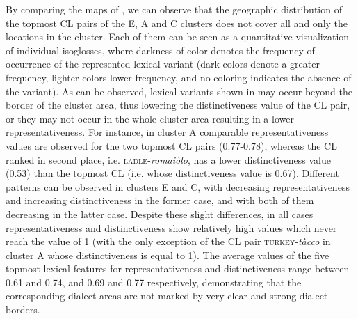 \documentclass[output=paper]{LSP/langsci}
\begin{document}
By comparing the maps of , we can observe that the geographic distribution of the topmost CL pairs of the E, A and C clusters does not cover all and only the locations in the cluster. Each of them can be seen as a quantitative visualization of individual isoglosses, where darkness of color denotes the frequency of occurrence of the represented lexical variant (dark colors denote a greater frequency, lighter colors lower frequency, and no coloring indicates the absence of the variant). As can be observed, lexical variants shown in  may occur beyond the border of the cluster area, thus lowering the distinctiveness value of the CL pair, or they may not occur in the whole cluster area resulting in a lower representativeness. For instance, in cluster A comparable representativeness values are observed for the two topmost CL pairs (0.77-0.78), whereas the CL ranked in second place, i.e. \textsc{ladle}{}-\textit{romaiòlo}, has a lower distinctiveness value (0.53) than the topmost CL (i.e. whose distinctiveness value is 0.67). Different patterns can be observed in clusters E and C, with decreasing representativeness and increasing distinctiveness in the former case, and with both of them decreasing in the latter case. Despite these slight differences, in all cases representativeness and distinctiveness show relatively high values which never reach the value of 1 (with the only exception of the CL pair \textsc{turkey}{}-\textit{tàcco} in cluster A whose distinctiveness is equal to 1). The average values of the five topmost lexical features for representativeness and distinctiveness range between 0.61 and 0.74, and 0.69 and 0.77 respectively, demonstrating that the corresponding dialect areas are not marked by very clear and strong dialect borders. 
\end{document}
